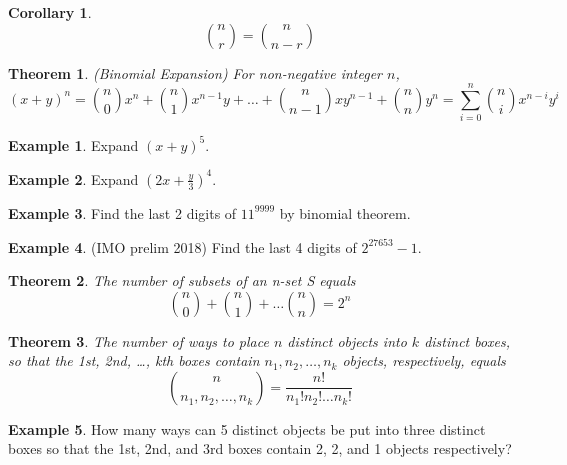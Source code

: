 \documentclass[addpoints]{exam}
\newtheorem{theorem}{Theorem}[section]
\theoremstyle{definition}
\newtheorem{corollary}{Corollary}[theorem]
\newtheorem{exmp}{Example}[section]
\begin{document}
\begin{corollary}
	\begin{equation*}
		\binom{n}{r} = \binom{n}{n-r}
	\end{equation*}
\end{corollary}

\begin{theorem}
	(Binomial Expansion) For non-negative integer $n$,
	\begin{equation*}
		(x+y)^n = \binom{n}{0} x^n + \binom{n}{1}x^{n-1}y + \ldots + \binom{n}{n-1}xy^{n-1} + \binom{n}{n}y^n = \sum_{i=0}^n \binom{n}{i} x^{n-i} y^{i}
	\end{equation*}
\end{theorem}

\begin{exmp}
	Expand $(x+y)^5$.
\end{exmp}

\begin{exmp}
	Expand $(2x+\frac{y}{3})^4$.
\end{exmp}

\begin{exmp}
	Find the last 2 digits of $11^{9999}$ by binomial theorem.
\end{exmp}

\begin{exmp}
	(IMO prelim 2018) Find the last 4 digits of $2^{27653}-1$.
\end{exmp}

\begin{theorem}
	The number of subsets of an n-set S equals
	\begin{equation*}
		\binom{n}{0} + \binom{n}{1} + \ldots \binom{n}{n} = 2^n
	\end{equation*}
\end{theorem}

\begin{theorem}
	The number of ways to place $n$ distinct objects into $k$ distinct boxes, so that the 1st, 2nd, \ldots, kth boxes contain $n_1, n_2, \ldots, n_k$ objects, respectively, equals
	\begin{equation*}
		\binom{n}{n_1,n_2,\ldots,n_k} = \frac{n!}{n_1!n_2!\ldots n_k!}
	\end{equation*}
\end{theorem}

\begin{exmp}
	How many ways can 5 distinct objects be put into three distinct boxes so that the 1st, 2nd, and 3rd boxes contain 2, 2, and 1 objects respectively?
\end{exmp}
\end{document}
